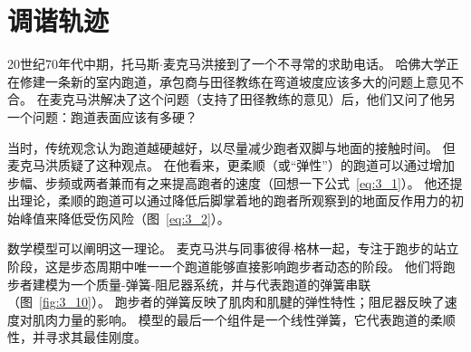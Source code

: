 \section{调谐轨迹}

20世纪70年代中期，托马斯$\cdot$麦克马洪接到了一个不寻常的求助电话。
哈佛大学正在修建一条新的室内跑道，承包商与田径教练在弯道坡度应该多大的问题上意见不合\cite{wingerson1983lion}。
在麦克马洪解决了这个问题（支持了田径教练的意见）后，他们又问了他另一个问题：跑道表面应该有多硬？


当时，传统观念认为跑道越硬越好，以尽量减少跑者双脚与地面的接触时间。
但麦克马洪质疑了这种观点。
在他看来，更柔顺（或“弹性”）的跑道可以通过增加步幅、步频或两者兼而有之来提高跑者的速度（回想一下公式~\ref{eq:3_1}）。
他还提出理论，柔顺的跑道可以通过降低后脚掌着地的跑者所观察到的地面反作用力的初始峰值来降低受伤风险（图~\ref{eq:3_2}）。


数学模型可以阐明这一理论。
麦克马洪与同事彼得$\cdot$格林一起，专注于跑步的站立阶段，这是步态周期中唯一一个跑道能够直接影响跑步者动态的阶段。
他们将跑步者建模为一个质量-弹簧-阻尼器系统，并与代表跑道的弹簧串联（图~\ref{fig:3_10}）。
跑步者的弹簧反映了肌肉和肌腱的弹性特性；阻尼器反映了速度对肌肉力量的影响。
模型的最后一个组件是一个线性弹簧，它代表跑道的柔顺性，并寻求其最佳刚度。


